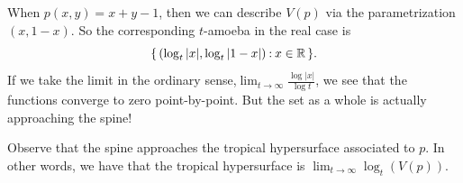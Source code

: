 \documentclass[12pt]{memoir}
\theoremstyle{definition}
\begin{document}
\begin{Ex}
    When $p(x,y)=x+y-1$, then we can describe $V(p)$ via the parametrization $(x,1-x)$. So the corresponding $t$-amoeba in the real case is 
    $$\{\,(\log_t|x|,\log_t|1-x|)\mathbin{:} x\in\mathbb{R}\,\}.$$
    If we take the limit in the ordinary sense,$\lim_{t\to\infty}\frac{\log|x|}{\log t}$, we see that the functions converge to zero point-by-point. But the set as a whole is actually approaching the spine!
    \begin{figure}[h!]
        \centering
        \quad
        \quad
        \label{fig:2.4-thru-2.6}
    \end{figure}
\end{Ex}

Observe that the spine approaches the tropical hypersurface associated to $p$. In other words, we have that the tropical hypersurface is $\lim_{t\to\infty}\log_t(V(p))$.
\end{document}
